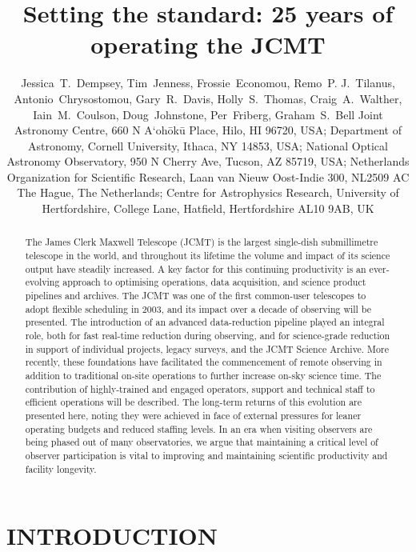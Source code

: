 \documentclass[]{spie}  %
\title{Setting the standard: 25 years of operating the JCMT}
\author{
Jessica~T.~Dempsey\supit{a},
Tim~Jenness\supit{b},
Frossie~Economou\supit{c},
Remo~P. J.~Tilanus\supit{d},
Antonio~Chrysostomou\supit{e},
Gary~R.~Davis\supit{a},
Holly~S.~Thomas\supit{a},
Craig~A.~Walther\supit{a},
Iain~M.~Coulson\supit{a},
Doug~Johnstone\supit{a},
Per~Friberg\supit{a},
Graham~S.~Bell\supit{a}
\skiplinehalf
\supit{a}Joint Astronomy Centre, 660 N A`oh\=ok\=u Place, Hilo, HI 96720, USA; \skiplinehalf
\supit{b}Department of Astronomy, Cornell University, Ithaca, NY 14853, USA; \skiplinehalf
\supit{c}National Optical Astronomy Observatory, 950 N Cherry Ave, Tucson, AZ 85719, USA; \skiplinehalf
\supit{d}Netherlands Organization for Scientific Research, Laan van Nieuw Oost-Indie 300, NL2509 AC The Hague, The Netherlands; \skiplinehalf
\supit{e}Centre for Astrophysics Research, University of Hertfordshire, College Lane, Hatfield, Hertfordshire AL10 9AB, UK
}
\begin{document}
  \maketitle

\begin{abstract}
  The James Clerk Maxwell Telescope (JCMT) is the largest single-dish
  submillimetre telescope in the world, and throughout its lifetime
  the volume and impact of its science output have steadily
  increased. A key factor for this continuing productivity is an
  ever-evolving approach to optimising operations, data acquisition,
  and science product pipelines and archives. The JCMT was one of the
  first common-user telescopes to adopt flexible scheduling in 2003,
  and its impact over a decade of observing will be presented.  The
  introduction of an advanced data-reduction pipeline played an
  integral role, both for fast real-time reduction during observing,
  and for science-grade reduction in support of individual projects,
  legacy surveys, and the JCMT Science Archive. More recently, these
  foundations have facilitated the commencement of remote observing in
  addition to traditional on-site operations to further increase
  on-sky science time. The contribution of highly-trained and engaged
  operators, support and technical staff to efficient operations will
  be described. The long-term returns of this evolution are presented
  here, noting they were achieved in face of external pressures for
  leaner operating budgets and reduced staffing levels. In an era when
  visiting observers are being phased out of many observatories, we
  argue that maintaining a critical level of observer participation is
  vital to improving and maintaining scientific productivity and
  facility longevity.
\end{abstract}


\keywords{}

\section{INTRODUCTION}
\label{sec:intro}
\end{document}
